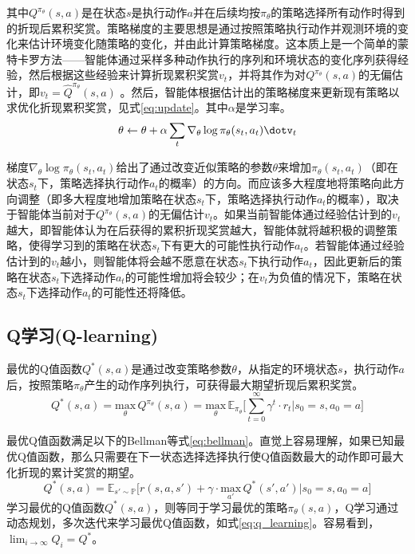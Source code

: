其中$Q^{\pi_\theta}(s,a)$是在状态$s$是执行动作$a$并在后续均按$\pi_\theta$的策略选择所有动作时得到的折现后累积奖赏。策略梯度的主要思想是通过按照策略执行动作并观测环境的变化来估计环境变化随策略的变化，并由此计算策略梯度。这本质上是一个简单的蒙特卡罗方法\cite{hastings1970monte}——智能体通过采样多种动作执行的序列和环境状态的变化序列获得经验，然后根据这些经验来计算折现累积奖赏$v_t$，并将其作为对$Q^{\pi_\theta}(s,a)$的无偏估计，即$v_t = \hat{Q}^{\pi_\theta}(s,a)$ 。然后，智能体根据估计出的策略梯度来更新现有策略以求优化折现累积奖赏\cite{sutton2000policy}，见式\ref{eq:update}。其中$\alpha$是学习率。
\begin{equation}
  \label{eq:update}
  \theta \leftarrow \theta + \alpha\sum_{t}{}\nabla_{\theta}\operatorname{log}\pi_{\theta}(s_t, a_t)\dotv_t
\end{equation}

梯度$\nabla_{\theta}\operatorname{log}\pi_{\theta}(s_t, a_t)$给出了通过改变近似策略的参数$\theta$来增加$\pi_{\theta}(s_t, a_t)$（即在状态$s_t$下，策略选择执行动作$a_t$的概率）的方向。而应该多大程度地将策略向此方向调整（即多大程度地增加策略在状态$s_t$下，策略选择执行动作$a_t$的概率），取决于智能体当前对于$Q^{\pi_\theta}(s,a)$的无偏估计$v_t$。如果当前智能体通过经验估计到的$v_t$越大，即智能体认为在后获得的累积折现奖赏越大，智能体就将越积极的调整策略，使得学习到的策略在状态$s_t$下有更大的可能性执行动作$a_t$。若智能体通过经验估计到的$v_t$越小，则智能体将会越不愿意在状态$s_t$下执行动作$a_t$，因此更新后的策略在状态$s_t$下选择动作$a_t$的可能性增加将会较少；在$v_t$为负值的情况下，策略在状态$s_t$下选择动作$a_t$的可能性还将降低。

\subsection{Q学习(Q-learning)}
最优的Q值函数$Q^*(s,a)$是通过改变策略参数$\theta$，从指定的环境状态$s$，执行动作$a$后，按照策略$\pi_\theta$产生的动作序列执行，可获得最大期望折现后累积奖赏。
\begin{equation}
  \label{eq:q_opt}
    Q^*(s, a) = \underset{\theta}{\mathrm{max}}\,Q^{\pi_\theta}(s,a)=\underset{\theta}{\mathrm{max}}\,\mathbb{E}_{\pi_\theta}\bigg[\sum_{t=0}^{\infty} {\gamma^{t}} \cdot r_{t}|s_0=s, a_0=a\bigg]
\end{equation}

最优Q值函数满足以下的Bellman等式\ref{eq:bellman}。直觉上容易理解，如果已知最优Q值函数，那么只需要在下一状态选择选择执行使Q值函数最大的动作即可最大化折现的累计奖赏的期望。
\begin{equation}
  \label{eq:bellman}
    Q^*(s, a) = \mathbb{E}_{s' \sim \mathbb{P}}\big[r(s,a,s') + \gamma\cdot \underset{a'}{\mathrm{max}}\,Q^*(s',a') |s_0=s, a_0=a\big]
\end{equation}
学习最优的Q值函数$Q^*(s,a)$，则等同于学习最优的策略$\pi_\theta(s,a)$，Q学习通过动态规划，多次迭代来学习最优Q值函数，如式\ref{eq:q_learning}。容易看到，$\lim_{i\to\infty} Q_i = Q^* $。

